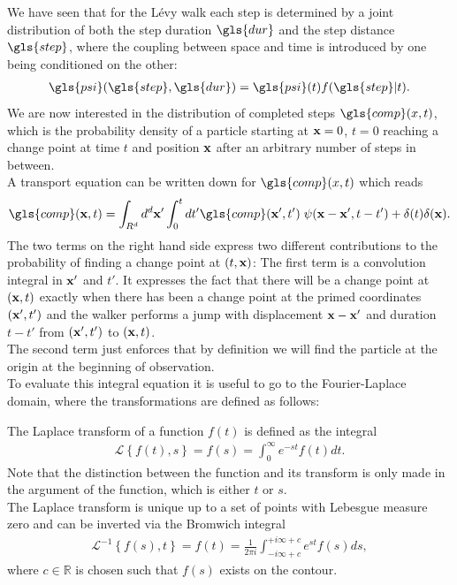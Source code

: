 We have seen that for the L\'evy walk each step is determined by a joint distribution of both the step duration $\gls{dur}$ and the step distance $\gls{step}$, where the coupling between space and time is introduced by one being conditioned on the other:
%
\begin{align}
\gls{psi}(\gls{step}, \gls{dur}) = \gls{psi}(t) f(\gls{step}|t) .
\end{align}
%
We are now interested in the distribution of completed steps $\gls{comp}(x,t)$, which is the probability density of a particle starting at $\mathbf{ x }=0$, $t=0$ reaching a change point at time $t$ and position $\mathbf{ x }$ after an arbitrary number of steps in between. \\
A transport equation can be written down for $\gls{comp}(x,t)$  which reads 
\cite{firstSteps}
%
\begin{align}
\gls{comp}(\ve{x},t) = \int_{R^{d}} d^{d}\ve{x}' \int_{0}^{t} dt' \gls{comp}(\ve{x}',t')  \; \psi(\ve{x}-\ve{x}',t-t') + \delta(t) \delta(\ve{x}) . \label{eqn:CTransport}
\end{align}
%
The two terms on the right hand side express two different contributions to the probability of finding a change point at $(t,\mathbf{ x })$: The first term is a convolution integral in $\mathbf{ x' }$ and $t'$. It expresses the fact that there will be a change point at $(\mathbf{ x },t)$ exactly when there has been a change point at the primed coordinates $(\mathbf{ x' },t')$ and the walker performs a jump with displacement $\mathbf{ x }-\mathbf{ x }'$ and duration $t-t'$ from $(\mathbf{ x' },t')$ to $(\mathbf{ x },t)$.  \\
The second term just enforces that by definition we will find the particle at the origin at the beginning of observation. \\
To evaluate this integral equation it is useful to go to the Fourier-Laplace domain, where the transformations are defined as follows:

The Laplace transform of a function $f(t)$ is defined as the integral 
%
\begin{align}
\mathcal{L} \left\{ f(t), s \right\} = f(s) = \int^{\infty}_{0} e^{-st} f(t) dt .
\end{align}
%
Note that the distinction between the function and its transform is only made in the argument of the function, which is either $t$ or $s$. \\
The Laplace transform is unique up to a set of points with Lebesgue measure zero and can be inverted via the Bromwich integral 
%
\begin{align}
\mathcal{L}^{-1} \left\{ f(s), t \right\} = f(t) = \frac{1}{2 \pi i} \int^{+i \infty + c}_{-i \infty + c} e^{st} f(s) ds, 
\end{align}
%
where $c \in \mathbb{R}$ is chosen such that $f(s)$ exists on the contour. 

